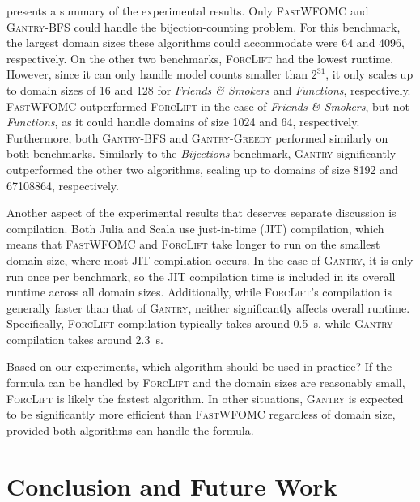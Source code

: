 \documentclass[a4paper,UKenglish,cleveref, autoref, thm-restate]{lipics-v2021}
\newcommand{\Cranetwo}{\textsc{Gantry}}
\newcommand{\Cranebfs}{\textsc{Gantry-BFS}}
\newcommand{\Cranegreedy}{\textsc{Gantry-Greedy}}
\newcommand{\friends}{\emph{Friends \& Smokers}}
\newcommand{\functions}{\emph{Functions}}
\newcommand{\bijections}{\emph{Bijections}}
\begin{document}

 presents a summary of the experimental results. Only
\textsc{FastWFOMC} and \Cranebfs{} could handle the bijection-counting problem.
For this benchmark, the largest domain sizes these algorithms could accommodate
were \num{64} and \num{4096}, respectively. On the other two benchmarks,
\textsc{ForcLift} had the lowest runtime. However, since it can only handle
model counts smaller than $2^{31}$, it only scales up to domain sizes of
\num{16} and \num{128} for \friends{} and \functions{}, respectively.
\textsc{FastWFOMC} outperformed \textsc{ForcLift} in the case of \friends{}, but
not \functions{}, as it could handle domains of size \num{1024} and \num{64},
respectively. Furthermore, both \Cranebfs{} and \Cranegreedy{} performed
similarly on both benchmarks. Similarly to the \bijections{} benchmark,
\Cranetwo{} significantly outperformed the other two algorithms, scaling up to
domains of size \num{8192} and \num{67108864}, respectively.

Another aspect of the experimental results that deserves separate discussion is
compilation. Both Julia and Scala use just-in-time (JIT) compilation, which
means that \textsc{FastWFOMC} and \textsc{ForcLift} take longer to run on the
smallest domain size, where most JIT compilation occurs. In the case of
\Cranetwo{}, it is only run once per benchmark, so the JIT compilation time is
included in its overall runtime across all domain sizes. Additionally, while
\textsc{ForcLift}'s compilation is generally faster than that of \Cranetwo{},
neither significantly affects overall runtime. Specifically, \textsc{ForcLift}
compilation typically takes around \SI{0.5}{\second}, while \Cranetwo{}
compilation takes around \SI{2.3}{\second}.

Based on our experiments, which algorithm should be used in practice? If the
formula can be handled by \textsc{ForcLift} and the domain sizes are reasonably
small, \textsc{ForcLift} is likely the fastest algorithm. In other situations,
\Cranetwo{} is expected to be significantly more efficient than
\textsc{FastWFOMC} regardless of domain size, provided both algorithms can
handle the formula.

\section{Conclusion and Future Work}\label{sec:conclusion}
\end{document}
